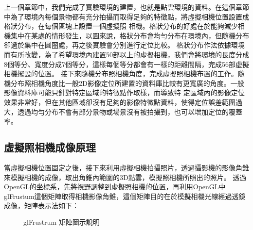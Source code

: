 	上一個章節中，我們完成了實驗環境的建置，也就是點雲環境的資料。在這個章節中為了環境內每個景物都有充分拍攝而取得足夠的特徵點，將虛擬相機位置設置成格狀分布，在每個區塊上設置一個虛擬照
	相機。格狀分布的好處在於能夠減少相機集中在某處的情形發生，以圖來說，格狀分布會均勻分布在環境內，但隨機分布卻過於集中在圓圈處，再之後實驗會分別進行定位比較。
	格狀分布作法依據環境而有所改變，為了希望環境內建置50部以上的虛擬相機，我們會將環境的長度分成8個等分、寬度分成7個等分，這樣每個等分都會有一樣的距離間隔，完成56部虛擬相機擺設的位置。
	接下來隨機分布照相機角度，完成虛擬照相機布置的工作。隨機分布照相機角度比一般2D影像定位所建置的資料庫比較有更寬廣的角度。一般影像資料庫可能只針對特定區域的特徵點作取樣，而導致特
	定區域內的影像定位效果非常好，但在其他區域卻沒有足夠的影像特徵點資料，使得定位誤差範圍過大，透過均勻分布不會有部分景物或場景沒有被拍攝到，也可以增加定位的覆蓋率。
	
\subsection{虛擬照相機成像原理}
%
	當虛擬相機位置固定之後，接下來利用虛擬相機拍攝照片，透過攝影機的影像角錐來模擬相機的成像，取出角錐內範圍的3D點雲，模擬照相機所照出的照片。
	透過OpenGL的坐標系，先將視野調整到虛擬照相機的位置，再利用OpenGL中glFrustum這個矩陣取得相機影像角錐，這個矩陣目的在於模擬相機光線經過透鏡成像，矩陣表示法如下：
	

\begin{figure}
  \begin{center}
  \end{center}
  \caption{glFrustrum 矩陣圖示說明}
  \label{fig:rotate axis}
\end{figure}
    
